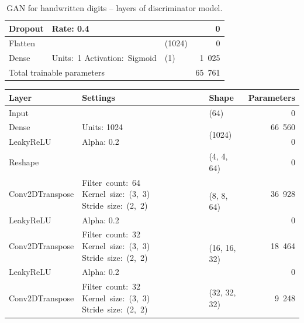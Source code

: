 \begin{table}
\begin{center}
\begin{tabular}{ |m{5em}|m{9em}|l|r| }
            \cline{1-2} \cline{4-4}
                Dropout & Rate: 0.4 & & 0 \\
            \hline
                Flatten & & (1024) & 0 \\
            \hline
                Dense & \mbox{Units: 1} \mbox{Activation: Sigmoid} & (1) & 1~025 \\
            \hline
            \hline
                \multicolumn{3}{|l|}{Total trainable parameters} & 65~761 \\
            \hline
        \end{tabular}
    \end{center}
    \caption{\label{tab:gan-mnist-discriminator}GAN for handwritten digits – layers of discriminator model.}
\end{table}

\begin{table}
    \begin{center}
        \begin{tabular}{ |m{8em}|m{8.8em}|l|r| }
            \hline
                Layer & Settings & Shape & \multicolumn{1}{l|}{Parameters} \\ 
            \hline
            \hline
                Input & & (64) & 0 \\
            \hline
                Dense & Units: 1024 & \multirow{2}{6em}{(1024)} & 66~560 \\
            \cline{1-2} \cline{4-4}
                LeakyReLU & Alpha: 0.2 & & 0 \\
            \hline
                Reshape & & (4, 4, 64) & 0 \\
            \hline
                Conv2DTranspose & \mbox{Filter count: 64} \mbox{Kernel size: (3, 3)} \mbox{Stride size: (2, 2)} & \multirow{2}{6em}{(8, 8, 64)} & 36~928 \\
            \cline{1-2} \cline{4-4}
                LeakyReLU & Alpha: 0.2 & & 0 \\
            \hline
                Conv2DTranspose & \mbox{Filter count: 32} \mbox{Kernel size: (3, 3)} \mbox{Stride size: (2, 2)} & \multirow{2}{6em}{(16, 16, 32)} & 18~464 \\
            \cline{1-2} \cline{4-4}
                LeakyReLU & Alpha: 0.2 & & 0 \\
            \hline
                Conv2DTranspose & \mbox{Filter count: 32} \mbox{Kernel size: (3, 3)} \mbox{Stride size: (2, 2)} & \multirow{2}{6em}{(32, 32, 32)} & 9~248 \\
            \cline{1-2} \cline{4-4}

\end{tabular}
\end{center}
\end{table}
